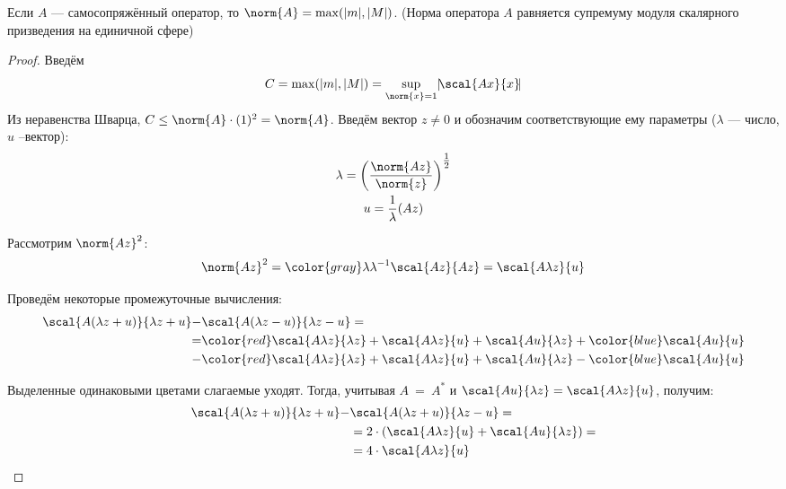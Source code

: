 	\begin{state}
		Если $A$ --- самосопряжённый оператор, то $\norm{A} = \max(|m|, |M|)$. 
		(Норма оператора $A$ равняется супремуму модуля скалярного призведения на единичной сфере)
	\end{state}
	\begin{proof}
		Введём 
		$$C = \max(|m|, |M|) = \underset{\norm{x} = 1}{\sup} |\!\scal{Ax}{x}\!|$$
		Из неравенства Шварца, $C \leq \norm{A} \cdot (1)^2 = \norm{A}$.
		Введём вектор $z \neq 0$ и обозначим соответствующие ему параметры ($\lambda$ --- число, $u$ --вектор):
		\begin{gather*}
			\lambda = \left(\frac{\norm{Az}}{\norm{z}}\right)^{\tfrac{1}{2}} \\
			u = \frac{1}{\lambda}(Az)
		\end{gather*}
		
		Рассмотрим $\norm{Az}^2$:
		\begin{equation} \label{eq:scalprod}
			\norm{Az}^2 = {\color{gray} \lambda\lambda^{-1}} \scal{Az}{Az} = \scal{A \lambda z}{u}
		\end{equation}
		
		Проведём некоторые промежуточные вычисления:
		\begin{equation*}
		\begin{split}
			\scal{A(\lambda z + u)}{\lambda z + u} - &\scal{A(\lambda z - u)}{\lambda z - u} = \\
			  = &{\color{red}\scal{A \lambda z}{\lambda z}} + \scal{A\lambda z}{u} + \scal{Au}{\lambda z} + {\color{blue}\scal{Au}{u}} \\
			  - &{\color{red}\scal{A \lambda z}{\lambda z}} + \scal{A\lambda z}{u} + \scal{Au}{\lambda z} - {\color{blue}\scal{Au}{u}}
		\end{split}
		\end{equation*}
		
		Выделенные одинаковыми цветами слагаемые уходят. Тогда, учитывая $A~=~A^{*}$ и 
		$\scal{Au}{\lambda z} = \scal{A\lambda z}{u}$, получим:
		\begin{equation} \label{eq:scalproddiff}
		\begin{split}
			\scal{A(\lambda z + u)}{\lambda z + u} - &\scal{A(\lambda z + u)}{\lambda z - u} = \\
			 &= 2 \cdot \left(\scal{A\lambda z}{u} + \scal{Au}{\lambda z}\right) = \\
			 &= 4 \cdot \scal{A\lambda z}{u}
		\end{split}
		\end{equation}
		

\end{proof}
